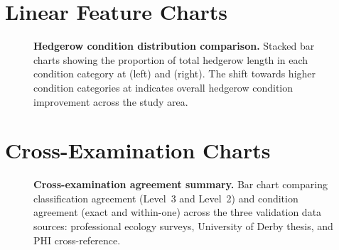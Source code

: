\section{Linear Feature Charts}

\begin{figure}[H]
\centering
{}
\caption[Hedgerow condition comparison 2016 vs 2026.]{%
\textbf{Hedgerow condition distribution comparison.} Stacked bar charts showing the proportion of total hedgerow length in each condition category at \Tzero{} (left) and \Tone{} (right). The shift towards higher condition categories at \Tone{} indicates overall hedgerow condition improvement across the study area.%
}
\label{fig:cat-hedge-condition}
\end{figure}


\section{Cross-Examination Charts}

\begin{figure}[H]
\centering
{}
\caption[Validation agreement summary across data sources.]{%
\textbf{Cross-examination agreement summary.} Bar chart comparing classification agreement (Level~3 and Level~2) and condition agreement (exact and within-one) across the three validation data sources: professional ecology surveys, University of Derby thesis, and PHI cross-reference.%
}
\label{fig:cat-validation-summary}
\end{figure}
